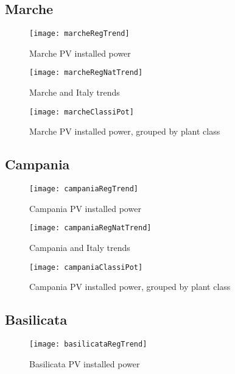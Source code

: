 \documentclass[12pt,a4paper,openright,twoside]{report}
\begin{document}
\subsection*{Marche}

\begin{figure}[hp]
	\centering
	\texttt{[image: marcheRegTrend]}
	\caption{Marche PV installed power}
	\label{marcheRegTrend}
\end{figure}

\begin{figure}[hp]
	\centering
	\texttt{[image: marcheRegNatTrend]}
	\caption{Marche and Italy trends}
	\label{marcheRegNatTrend}
\end{figure}

\begin{figure}[hp]
	\centering
	\texttt{[image: marcheClassiPot]}
	\caption{Marche PV installed power, grouped by plant class}
	\label{marcheClassiPot}
\end{figure}

\clearpage

\subsection*{Campania}

\begin{figure}[hp]
	\centering
	\texttt{[image: campaniaRegTrend]}
	\caption{Campania PV installed power}
	\label{campaniaRegTrend}
\end{figure}

\begin{figure}[hp]
	\centering
	\texttt{[image: campaniaRegNatTrend]}
	\caption{Campania and Italy trends}
	\label{campaniaRegNatTrend}
\end{figure}

\begin{figure}[hp]
	\centering
	\texttt{[image: campaniaClassiPot]}
	\caption{Campania PV installed power, grouped by plant class}
	\label{campaniaClassiPot}
\end{figure}

\subsection*{Basilicata}

\begin{figure}[hp]
	\centering
	\texttt{[image: basilicataRegTrend]}
	\caption{Basilicata PV installed power}
	\label{basilicataRegTrend}
\end{figure}
\end{document}
